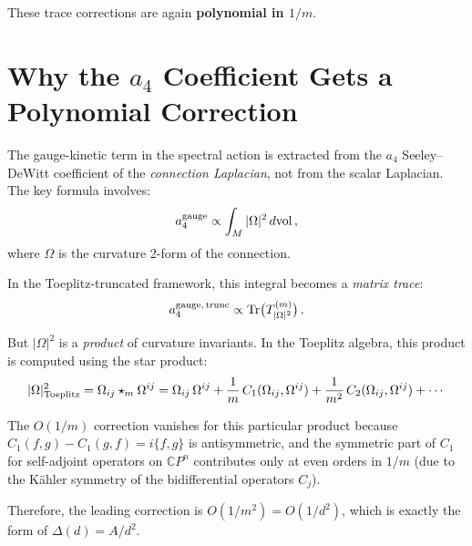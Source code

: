 \documentclass[12pt,a4paper]{article}
\theoremstyle{definition}
\begin{document}
These trace corrections are again \textbf{polynomial in $1/m$}.

\section{Why the $a_4$ Coefficient Gets a Polynomial Correction}
\label{sec:a4-correction}

The gauge-kinetic term in the spectral action is extracted from the
$a_4$ Seeley--DeWitt coefficient of the \emph{connection Laplacian},
not from the scalar Laplacian.  The key formula involves:
\begin{equation}
a_4^{\rm gauge} \propto \int_M |\Omega|^2\,d\mathrm{vol}\,,
\end{equation}
where $\Omega$ is the curvature 2-form of the connection.

In the Toeplitz-truncated framework, this integral becomes a
\emph{matrix trace}:
\begin{equation}
a_4^{\rm gauge,\,trunc} \propto \mathrm{Tr}\bigl(T_{|\Omega|^2}^{(m)}\bigr)\,.
\end{equation}

But $|\Omega|^2$ is a \emph{product} of curvature invariants.  In the
Toeplitz algebra, this product is computed using the star product:
\begin{equation}
|\Omega|^2_{\rm Toeplitz} = \Omega_{ij} \star_m \Omega^{ij}
= \Omega_{ij}\,\Omega^{ij}
+ \frac{1}{m}\,C_1(\Omega_{ij}, \Omega^{ij})
+ \frac{1}{m^2}\,C_2(\Omega_{ij}, \Omega^{ij})
+ \cdots
\end{equation}

The $O(1/m)$ correction vanishes for this particular product because
$C_1(f,g) - C_1(g,f) = i\{f,g\}$ is antisymmetric, and the symmetric
part of $C_1$ for self-adjoint operators on $\mathbb{C}P^n$ contributes
only at even orders in $1/m$ (due to the K\"ahler symmetry of the
bidifferential operators $C_j$).

Therefore, the leading correction is $O(1/m^2) = O(1/d^2)$, which is
exactly the form of $\Delta(d) = A/d^2$.
\end{document}
